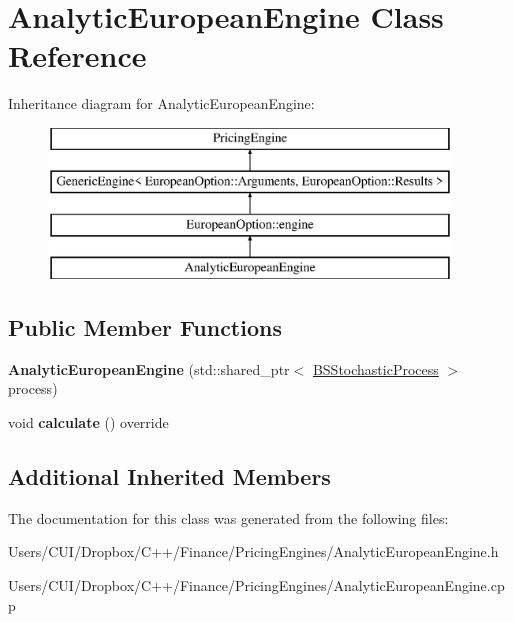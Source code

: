 \hypertarget{class_analytic_european_engine}{}\section{Analytic\+European\+Engine Class Reference}
\label{class_analytic_european_engine}
Inheritance diagram for Analytic\+European\+Engine\+:\begin{figure}[H]
\begin{center}
\leavevmode
\includegraphics[height=4.000000cm]{class_analytic_european_engine}
\end{center}
\end{figure}
\subsection*{Public Member Functions}
\begin{DoxyCompactItemize}
\item 
\hypertarget{class_analytic_european_engine_ae29c59f14976eaa910d4773d11aa234f}{}\label{class_analytic_european_engine_ae29c59f14976eaa910d4773d11aa234f} 
{\bfseries Analytic\+European\+Engine} (std\+::shared\+\_\+ptr$<$ \hyperlink{class_b_s_stochastic_process}{B\+S\+Stochastic\+Process} $>$ process)
\item 
\hypertarget{class_analytic_european_engine_adeda22c7b482779d7deaa17037195487}{}\label{class_analytic_european_engine_adeda22c7b482779d7deaa17037195487} 
void {\bfseries calculate} () override
\end{DoxyCompactItemize}
\subsection*{Additional Inherited Members}


The documentation for this class was generated from the following files\+:\begin{DoxyCompactItemize}
\item 
Users/\+C\+U\+I/\+Dropbox/\+C++/\+Finance/\+Pricing\+Engines/Analytic\+European\+Engine.\+h\item 
Users/\+C\+U\+I/\+Dropbox/\+C++/\+Finance/\+Pricing\+Engines/Analytic\+European\+Engine.\+cpp\end{DoxyCompactItemize}
